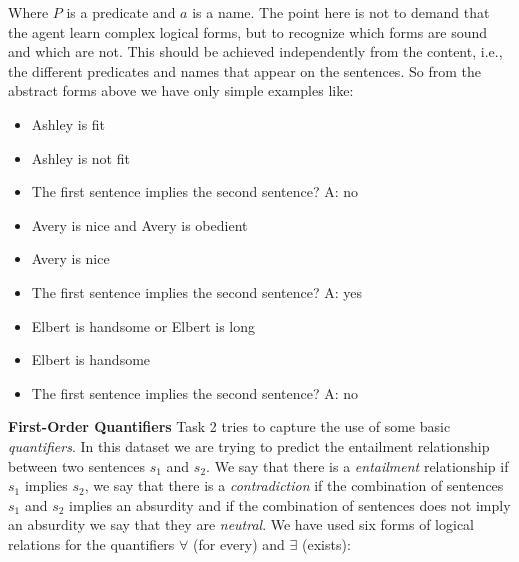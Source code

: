 Where $P$ is a predicate and $a$ is a name. The point here is not to demand that the agent learn complex logical forms, but to recognize which forms are sound and which are not. This should be achieved independently from the content, i.e., the different predicates and names that appear on the sentences. So from the abstract forms above we have only simple examples like:

\begin{itemize} 
\item[] Ashley is fit
\item[] Ashley is not fit
\item[] The first sentence implies the second sentence? A: no
\end{itemize}

\vspace{0.3cm}


\begin{itemize} 
\item[]Avery is nice and Avery is obedient
\item[]Avery is nice
\item[]The first sentence implies the second sentence? A: yes
\end{itemize}

\vspace{0.3cm}

\begin{itemize} 
\item[]Elbert is handsome or Elbert is long
\item[]Elbert is handsome
\item[]The first sentence implies the second sentence? A: no
\end{itemize}

\textbf{First-Order Quantifiers} Task 2 tries to capture the use of some basic \textit{quantifiers}. In this dataset we are trying to predict the entailment relationship between two sentences $s_1$ and $s_2$. We say that there is a \textit{entailment} relationship if $s_1$ implies $s_2$, we say that there is a \textit{contradiction} if the combination of sentences $s_1$ and $s_2$ implies an absurdity and if the combination of sentences does not imply an absurdity we say that they are \textit{neutral}. We have used six forms of logical relations for the quantifiers $\forall$ (for every) and $\exists$ (exists):

